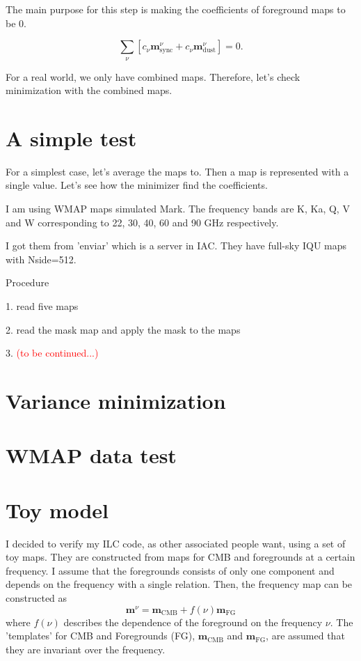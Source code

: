 \documentclass[11pt]{article}
\begin{document}
The main purpose for this step is making the coefficients of foreground maps to be 0.

\begin{equation}
    \sum_\nu \left[
    c_\nu \mathbf{m}_\text{sync}^\nu +
    c_\nu \mathbf{m}_\text{dust}^\nu 
    \right]=0.
\end{equation}

For a real world, we only have combined maps. Therefore, let's check minimization with the combined maps. 

\section{A simple test}

For a simplest case, let's average the maps to. Then a map is represented with a single value. Let's see how the minimizer find the coefficients.

I am using WMAP maps simulated Mark. The frequency bands are K, Ka, Q, V and W corresponding to 22, 30, 40, 60 and 90 GHz respectively.

I got them from 'enviar' which is a server in IAC. 
They have full-sky IQU maps with Nside=512. 

Procedure

1. read five maps

2. read the mask map and apply the mask to the maps

3. \textcolor{red}{(to be continued...)}

\section{Variance minimization}

\section{WMAP data test}

\section{Toy model}

I decided to verify my ILC code, as other associated people want, using a set of toy maps. They are constructed from maps for CMB and foregrounds at a certain frequency. I assume that the foregrounds consists of only one component and depends on the frequency with a single relation.
Then, the frequency map can be constructed as
\begin{equation}
    \mathbf{m}^{\nu} = \mathbf{m}_{\text{CMB}} + f(\nu) \mathbf{m}_{\text{FG}}
\end{equation}
where $f(\nu)$ describes the dependence of the foreground on the frequency $\nu$. The 'templates' for CMB and Foregrounds (FG), $\textbf{m}_\text{CMB}$ and $\textbf{m}_\text{FG}$, are assumed that they are invariant over the frequency. 
\end{document}
